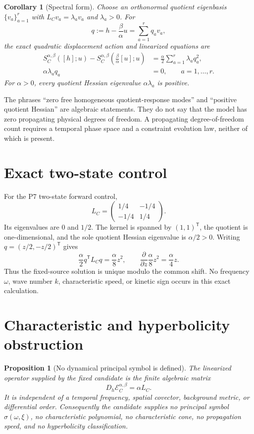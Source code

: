 \documentclass[11pt]{article}
\newtheorem{proposition}{Proposition}
\newtheorem{corollary}{Corollary}
\newcommand{\Eop}{\mathcal E_C^{\alpha,\beta}}
\begin{document}
\begin{corollary}[Spectral form]
\label{cor:spectral}
Choose an orthonormal quotient eigenbasis
\(\{v_a\}_{a=1}^{r}\) with \(L_Cv_a=\lambda_av_a\) and
\(\lambda_a>0\).  For
\[
 q:=h-\frac{\beta}{\alpha}u
 =\sum_{a=1}^{r}q_av_a,
\]
the exact quadratic displacement action and linearized equations are
\begin{align}
 S_C^{\alpha,\beta}([h];u)-S_C^{\alpha,\beta}
 \!\left(\frac{\beta}{\alpha}[u];u\right)
 &=\frac{\alpha}{2}\sum_{a=1}^{r}\lambda_aq_a^2,\\
 \alpha\lambda_aq_a&=0,\qquad a=1,\ldots,r.
 \label{eq:spectral}
\end{align}
For \(\alpha>0\), every quotient Hessian eigenvalue
\(\alpha\lambda_a\) is positive.
\end{corollary}

The phrases ``zero free homogeneous quotient-response modes'' and
``positive quotient Hessian'' are algebraic statements.  They do not say
that the model has zero propagating physical degrees of freedom.  A
propagating degree-of-freedom count requires a temporal phase space and a
constraint evolution law, neither of which is present.

\section{Exact two-state control}

For the P7 two-state forward control,
\[
 L_C=
 \begin{pmatrix}
 1/4&-1/4\\
 -1/4&1/4
 \end{pmatrix}.
\]
Its eigenvalues are \(0\) and \(1/2\).  The kernel is spanned by
\((1,1)^{\mathsf T}\), the quotient is one-dimensional, and the sole
quotient Hessian eigenvalue is \(\alpha/2>0\).  Writing
\(q=(z/2,-z/2)^{\mathsf T}\) gives
\[
 \frac{\alpha}{2}q^{\mathsf T}L_Cq=\frac{\alpha}{8}z^2,
 \qquad
 \frac{\partial}{\partial z}\frac{\alpha}{8}z^2
 =\frac{\alpha}{4}z.
\]
Thus the fixed-source solution is unique modulo the common shift.  No
frequency \(\omega\), wave number \(k\), characteristic speed, or kinetic
sign occurs in this exact calculation.

\section{Characteristic and hyperbolicity obstruction}

\begin{proposition}[No dynamical principal symbol is defined]
\label{prop:principal}
The linearized operator supplied by the fixed candidate is the finite
algebraic matrix
\[
 D_h\Eop=\alpha L_C.
\]
It is independent of a temporal frequency, spatial covector, background
metric, or differential order.  Consequently the candidate supplies no
principal symbol \(\sigma(\omega,\xi)\), no characteristic polynomial, no
characteristic cone, no propagation speed, and no hyperbolicity
classification.
\end{proposition}
\end{document}
